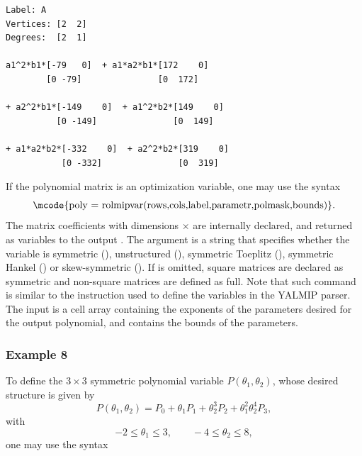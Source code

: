 \documentclass[english,11pt]{article}
\theoremstyle{break} \theorembodyfont{\small\rm}
\begin{document}
\begin{minipage}{13.0cm}
\begin{lstlisting}[rulecolor=\color{red}]
Label: A
Vertices: [2  2]
Degrees:  [2  1]

a1^2*b1*[-79   0]  + a1*a2*b1*[172    0]
        [0 -79]               [0  172]

+ a2^2*b1*[-149    0]  + a1^2*b2*[149    0]
          [0 -149]               [0  149]

+ a1*a2*b2*[-332    0]  + a2^2*b2*[319    0]
           [0 -332]               [0  319]
\end{lstlisting}
\end{minipage}
\vspace{0.2cm}

If the polynomial matrix is an optimization variable, one may use the syntax
\[
\mbox{\mcode{poly = rolmipvar(rows,cols,label,parametr,polmask,bounds)}}.
\]
The matrix coefficients with dimensions  $\times$
 are internally declared, and returned as  variables
to the output . The argument 
is a string that specifies whether the variable is symmetric (),
unstructured (),
symmetric Toeplitz (), symmetric
Hankel () or skew-symmetric ().
If  is omitted, square matrices are declared as symmetric and
non-square matrices are defined as full.
Note that such command is similar to the  instruction
used to define the variables in the YALMIP parser. The input  is a
cell array containing the exponents of the parameters desired for the output polynomial,
and  contains the bounds of the parameters.

\subsubsection*{Example 8}
To define the $3 \times 3$ symmetric polynomial variable $P(\theta_1,\theta_2)$, whose desired
structure is given by
\[
P(\theta_1,\theta_2) = P_0 + \theta_1P_1 + \theta_2^3P_2 + \theta_1^2\theta_2^4P_3,
\]
with
\[
 -2 \leq \theta_1 \leq 3, \qquad -4 \leq \theta_2 \leq 8,
\]
one may use the syntax

\vspace{0.5cm}%
\noindent\begin{minipage}{\linewidth}
\end{minipage}
\vspace{0.2cm}
\end{document}
